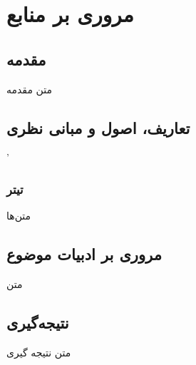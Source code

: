 \section{مروری بر منابع}\label{sec:sources}

\subsection{مقدمه}\label{subsec:sources_subject}
متن مقدمه

\subsection{تعاریف، اصول و مبانی نظری}\label{subsec:sources_vocab}'
\subsubsection{تیتر}
متن‌ها


\subsection{مروری بر ادبیات موضوع}\label{subsec:sources_vocab2}
متن

\subsection{نتیجه‌گیری}\label{subsec:sources_results}
متن نتیجه گیری

\cleardoublepage 